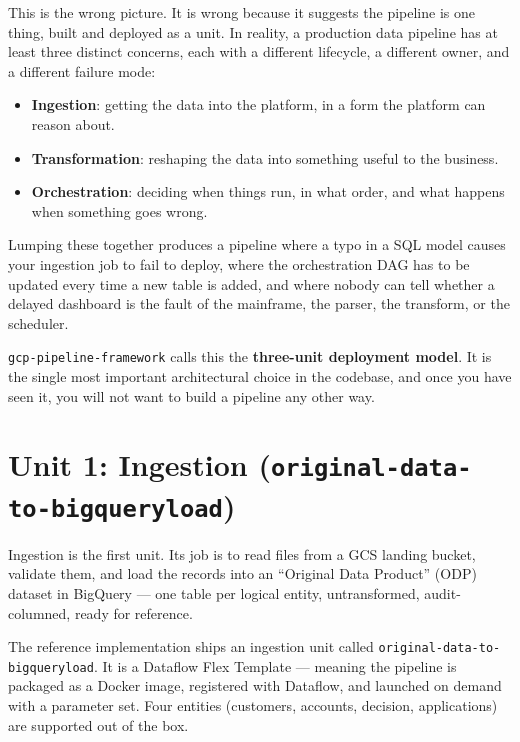 \documentclass[
  11pt,
  british,
  oneside]{book}
\providecommand{\tightlist}{%
  \setlength{\itemsep}{0pt}\setlength{\parskip}{0pt}}
\begin{document}
\FloatBarrier

This is the wrong picture. It is wrong because it suggests the pipeline
is one thing, built and deployed as a unit. In reality, a production
data pipeline has at least three distinct concerns, each with a
different lifecycle, a different owner, and a different failure mode:

\begin{itemize}
\tightlist
\item
  \textbf{Ingestion}: getting the data into the platform, in a form the
  platform can reason about.
\item
  \textbf{Transformation}: reshaping the data into something useful to
  the business.
\item
  \textbf{Orchestration}: deciding when things run, in what order, and
  what happens when something goes wrong.
\end{itemize}

Lumping these together produces a pipeline where a typo in a SQL model
causes your ingestion job to fail to deploy, where the orchestration DAG
has to be updated every time a new table is added, and where nobody can
tell whether a delayed dashboard is the fault of the mainframe, the
parser, the transform, or the scheduler.

\texttt{gcp-pipeline-framework} calls this
the \textbf{three-unit deployment
model}. It is the single most
important architectural choice in the codebase, and once you have seen
it, you will not want to build a pipeline any other way.

\hypertarget{unit-1-ingestion-original-data-to-bigqueryload}{%
\section{\texorpdfstring{Unit 1: Ingestion
(\texttt{original-data-to-bigqueryload})}{Unit 1: Ingestion (original-data-to-bigqueryload)}}\label{unit-1-ingestion-original-data-to-bigqueryload}}

Ingestion is the first unit. Its job is to read files from a GCS landing
bucket, validate them, and load the records into an ``Original Data
Product'' (ODP) dataset in BigQuery --- one table per logical entity,
untransformed, audit-columned, ready for reference.

The reference implementation ships an ingestion unit called
\texttt{original-data-to-bigqueryload}. It is a Dataflow Flex
Template --- meaning the
pipeline is packaged as a Docker image, registered with
Dataflow, and launched on demand with a parameter set. Four entities
(customers, accounts, decision, applications) are supported out of the
box.
\end{document}
